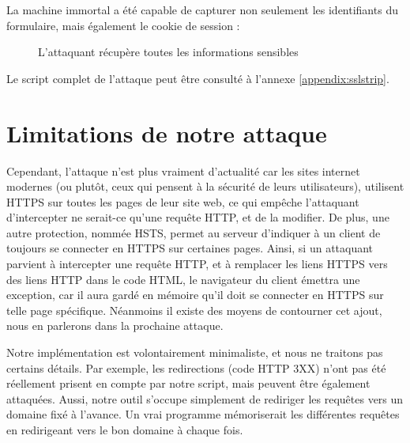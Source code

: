 La machine immortal a été capable de capturer non seulement les identifiants du formulaire, mais également le cookie de session :

\begin{figure}[H]
  \caption{L'attaquant récupère toutes les informations sensibles}
\end{figure}

Le script complet de l'attaque peut être consulté à l'annexe \ref{appendix:sslstrip}.

\section{Limitations de notre attaque}

Cependant, l'attaque n'est plus vraiment d'actualité car les sites internet modernes (ou plutôt, ceux qui pensent à la sécurité de leurs utilisateurs), utilisent HTTPS sur toutes les pages de leur site web, ce qui empêche l'attaquant d'intercepter ne serait-ce qu'une requête HTTP, et de la modifier. De plus, une autre protection, nommée HSTS, permet au serveur d'indiquer à un client de toujours se connecter en HTTPS sur certaines pages. Ainsi, si un attaquant parvient à intercepter une requête HTTP, et à remplacer les liens HTTPS vers des liens HTTP dans le code HTML, le navigateur du client émettra une exception, car il aura gardé en mémoire qu'il doit se connecter en HTTPS sur telle page spécifique. Néanmoins il existe des moyens de contourner cet ajout, nous en parlerons dans la prochaine attaque.

Notre implémentation est volontairement minimaliste, et nous ne traitons pas certains détails. Par exemple, les redirections (code HTTP 3XX) n'ont pas été réellement prisent en compte par notre script, mais peuvent être également attaquées. Aussi, notre outil s'occupe simplement de rediriger les requêtes vers un domaine fixé à l'avance. Un vrai programme mémoriserait les différentes requêtes en redirigeant vers le bon domaine à chaque fois.
